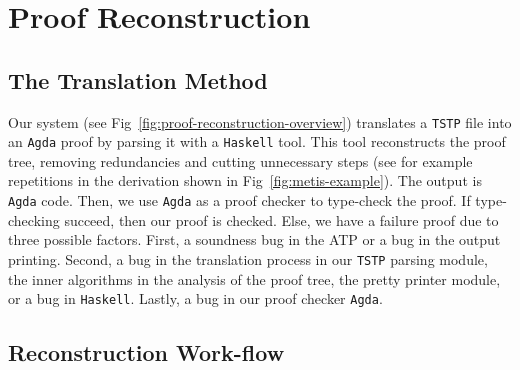 \documentclass[../main.tex]{subfiles}
\begin{document}

\section{Proof Reconstruction}
\label{sec:proof-reconstruction}

\subsection{The Translation Method}

Our system (see Fig~\ref{fig:proof-reconstruction-overview}) translates a \verb!TSTP!
file into an \verb!Agda! proof by parsing it with a \verb!Haskell! tool.
This tool reconstructs the proof tree, removing redundancies and
cutting unnecessary steps (see for example repetitions in the derivation shown in
Fig~\ref{fig:metis-example}). The output is \verb!Agda! code.
Then, we use \verb!Agda! as a proof checker to type-check the proof.
If type-checking succeed, then our proof is checked. Else, we have a failure
proof due to three possible factors. First, a soundness bug in the ATP or a bug
in the output printing. Second, a bug in the translation process in our \verb!TSTP! parsing
module, the inner algorithms in the analysis of the proof tree, the pretty printer
module, or a bug in \verb!Haskell!. Lastly, a bug in our proof checker \verb!Agda!.


\subsection{Reconstruction Work-flow}
\end{document}
